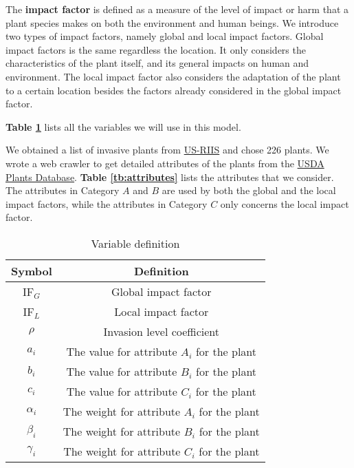 \documentclass[12pt]{article}
\begin{document}
		The \textbf{impact factor} is defined as a measure of the level of impact or harm that a plant species makes on both the environment and human beings.  We introduce two types of impact factors, namely global and local impact factors.  Global impact factors is the same regardless the location.  It only considers the characteristics of the plant itself, and its general impacts on human and environment.  The local impact factor also considers the adaptation of the plant to a certain location besides the factors already considered in the global impact factor.  
		
		\textbf{Table \ref{tb:syms}} lists all the variables we will use in this model.
		
		We obtained a list of invasive plants from \href{https://www.sciencebase.gov/catalog/item/5b911a5ce4b0702d0e808588}{US-RIIS}\autocite{US-RIIS} and chose 226 plants.  We wrote a web crawler to get detailed attributes of the plants from the \href{https://plants.usda.gov/home/}{USDA Plants Database}\autocite{USDA}.  \textbf{Table \ref{tb:attributes}} lists the attributes that we consider.  The attributes in Category $A$ and $B$ are used by both the global and the local impact factors, while the attributes in Category $C$ only concerns the local impact factor.
		
		{
			\fontsize{10}{14}\selectfont
			{
				\begin{longtable}{cc}
					
					\caption{Variable definition}
					\label{tb:syms}\\
					\toprule
					Symbol&Definition\\
					\toprule
					IF$_G$&Global impact factor\\
					IF$_L$&Local impact factor\\
					$\rho$&Invasion level coefficient\\
					$a_i$&The value for attribute $A_i$ for the plant\\
					$b_i$&The value for attribute $B_i$ for the plant\\
					$c_i$&The value for attribute $C_i$ for the plant\\
					$\alpha_i$&The weight for attribute $A_i$ for the plant\\
					$\beta_i$&The weight for attribute $B_i$ for the plant\\
					$\gamma_i$&The weight for attribute $C_i$ for the plant\\
					\bottomrule
					
				\end{longtable}
			}
		}
		
\end{document}
